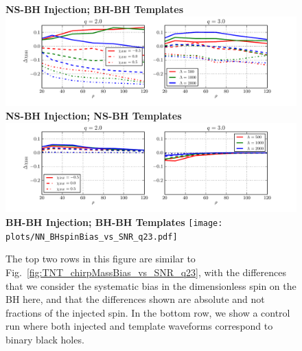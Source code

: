\documentclass[aps,prd,amsmath,floats,floatfix, twocolumn,
superscriptaddress,nofootinbib,showpacs]{revtex4-1}
\begin{document}
\begin{figure}
\centering    
\textbf{NS-BH Injection; BH-BH Templates}
\includegraphics[width=1.7\columnwidth]{plots/TN_BHspinBias_vs_SNR_q23.pdf}\\ 
\textbf{NS-BH Injection; NS-BH Templates}
\includegraphics[width=1.7\columnwidth]{plots/TT_BHspinBias_vs_SNR_q23.pdf}\\%
\textbf{BH-BH Injection; BH-BH Templates}
\texttt{[image: plots/NN\_BHspinBias\_vs\_SNR\_q23.pdf]}
\caption{The top two rows in this figure are
similar to Fig.~\ref{fig:TNT_chirpMassBias_vs_SNR_q23},
with the differences that we consider the systematic bias in the dimensionless
spin on the BH here, and that the differences shown are absolute and not
fractions of the injected spin. In the bottom row, we show a control run where
both injected and template waveforms correspond to binary black holes.}
\label{fig:TNT_BHspinBias_vs_SNR_q23}
\end{figure}
% 
\end{document}
